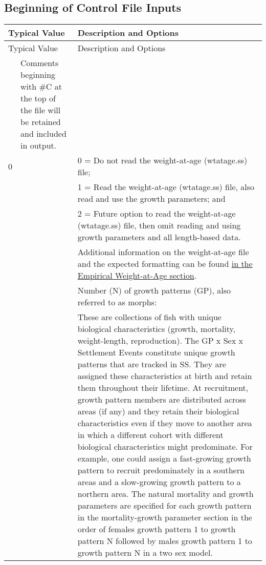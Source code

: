 \subsection{Beginning of Control File Inputs}
\begin{center}
	\begin{longtable}{p{0.5cm} p{2cm} p{12cm}}
		\hline
		\multicolumn{2}{l}{Typical Value} & Description and Options\Tstrut\Bstrut\\
		\hline
		\endfirsthead

		\hline
		\multicolumn{2}{l}{Typical Value} & Description and Options\Tstrut\Bstrut\\
		\hline
		\endhead

		\hline
		\endfoot

		\endlastfoot

		\multicolumn{2}{l}{\#C comment }\Tstrut & Comments beginning with \#C at the top of the file will be retained and included in output. \Bstrut\\
		\hline

		0 & & 0 = Do not read the weight-at-age (wtatage.ss) file; \Tstrut\\
		  & & 1 = Read the weight-at-age (wtatage.ss) file, also read and use the growth parameters; and \\
		  & & 2 = Future option to read the weight-at-age (wtatage.ss) file, then omit reading and using growth parameters and all length-based data.\\
		  & & Additional information on the weight-at-age file and the expected formatting can be found \hyperlink{WAA}{in the Empirical Weight-at-Age section}.\Bstrut\\

		\pagebreak
		1 & & Number (N) of growth patterns (GP), also referred to as morphs:\Tstrut\\
		& & These are collections of fish with unique biological characteristics (growth, mortality, weight-length, reproduction). The GP x Sex x Settlement Events constitute unique growth patterns that are tracked in SS. They are assigned these characteristics at birth and retain them throughout their lifetime. At recruitment, growth pattern members are distributed across areas (if any) and they retain their biological characteristics even if they move to another area in which a different cohort with different biological characteristics might predominate.  For example, one could assign a fast-growing growth pattern to recruit predominately in a southern areas and a slow-growing growth pattern to a northern area. The natural mortality and growth parameters are specified for each growth pattern in the mortality-growth parameter section in the order of females growth pattern 1 to growth pattern N followed by males growth pattern 1 to growth pattern N in a two sex model.\Bstrut\\


\end{longtable}
\end{center}

